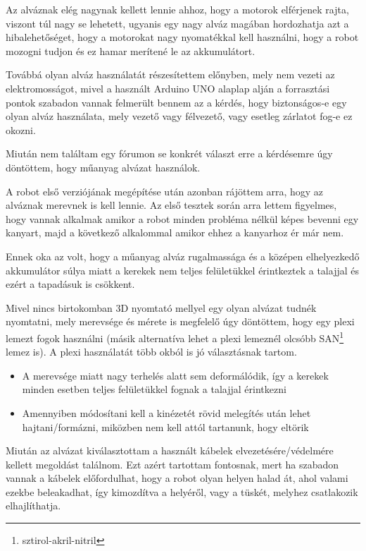 \documentclass[]{thesis-ekf}
\theoremstyle{definition}
\begin{document}
Az alváznak elég nagynak kellett lennie ahhoz, hogy a motorok elférjenek rajta, viszont túl nagy se lehetett, ugyanis egy nagy alváz magában hordozhatja azt a hibalehetőséget, hogy a motorokat nagy nyomatékkal kell használni, hogy a robot mozogni tudjon és ez hamar merítené le az akkumulátort.

Továbbá olyan alváz használatát részesítettem előnyben, mely nem vezeti az elektromosságot, mivel a használt Arduino UNO alaplap alján a forrasztási pontok szabadon vannak felmerült bennem az a kérdés, hogy biztonságos-e egy olyan alváz használata, mely vezető vagy félvezető, vagy esetleg zárlatot fog-e ez okozni.

Miután nem találtam egy fórumon se konkrét választ erre a kérdésemre úgy döntöttem, hogy műanyag alvázat használok.

A robot első verziójának megépítése után azonban rájöttem arra, hogy az alváznak merevnek is kell lennie. Az első tesztek során arra lettem figyelmes, hogy vannak alkalmak amikor a robot minden probléma nélkül képes bevenni egy kanyart, majd a következő alkalommal amikor ehhez a kanyarhoz ér már nem.

Ennek oka az volt, hogy a műanyag alváz rugalmassága és a középen elhelyezkedő akkumulátor súlya miatt a kerekek nem teljes felületükkel érintkeztek a talajjal és ezért a tapadásuk is csökkent.

Mivel nincs birtokomban 3D nyomtató mellyel egy olyan alvázat tudnék nyomtatni, mely merevsége és mérete is megfelelő úgy döntöttem, hogy egy plexi lemezt fogok használni (másik alternatíva lehet a plexi lemeznél olcsóbb SAN\footnote{sztirol-akril-nitril} lemez is). A plexi használatát több okból is jó választásnak tartom.
\begin{itemize}
	\item A merevsége miatt nagy terhelés alatt sem deformálódik, így a kerekek minden esetben teljes felületükkel fognak a talajjal érintkezni
	\item Amennyiben módosítani kell a kinézetét rövid melegítés után lehet hajtani/formázni, miközben nem kell attól tartanunk, hogy eltörik
\end{itemize}

Miután az alvázat kiválasztottam a használt kábelek elvezetésére/védelmére kellett megoldást találnom. Ezt azért tartottam fontosnak, mert ha szabadon vannak a kábelek előfordulhat, hogy a robot olyan helyen halad át, ahol valami ezekbe beleakadhat, így kimozdítva a helyéről, vagy a tüskét, melyhez csatlakozik elhajlíthatja.
\end{document}

